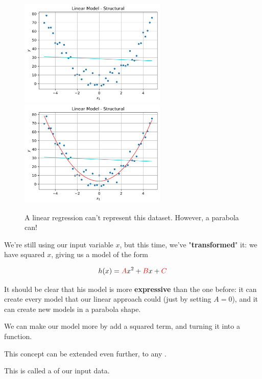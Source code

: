         \begin{figure}[H]
            
            \includegraphics[width=70mm,scale=0.5]{images/feature_images/Structural_Linear_Model.png}
            \includegraphics[width=70mm,scale=0.5]{images/feature_images/Structural_Quad_Model.png}
    
            \caption{A linear regression can't represent this dataset. However, a parabola can!}
        \end{figure}
    
        We're still using our input variable $x$, but this time, we've "\textbf{transformed}" it: we have squared $x$, giving us a model of the form
    
        \begin{equation}
            h(x) = \textcolor{red}{A}x^2+\textcolor{red}{B}x+\textcolor{red}{C}
        \end{equation}
    
        It should be clear that his model is more \textbf{expressive} than the one before: it can create every model that our linear approach could (just by setting $A=0$), and it can create new models in a parabola shape.
            \\
    
        \begin{concept}
            We can make our  model more  by add a squared term, and turning it into a  function.
    
            This concept can be extended even further, to any .

            This is called a  of our input data.
        \end{concept}

